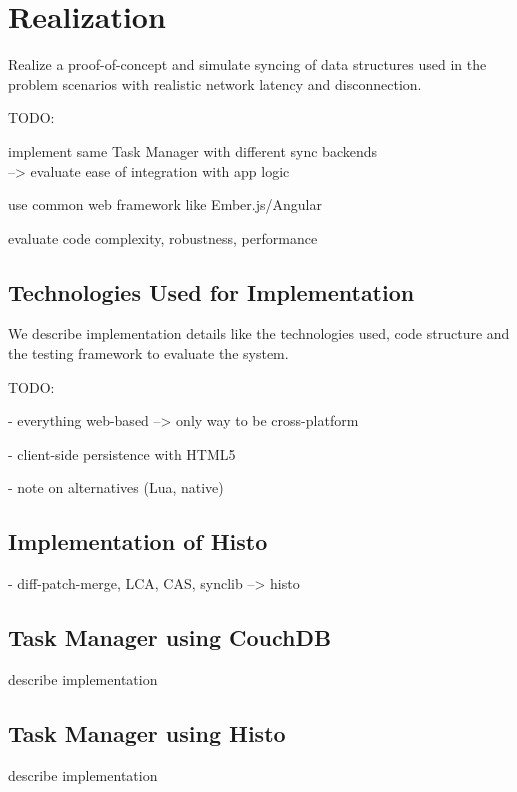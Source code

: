 
\chapter{Realization}
\label{sec:realization}

Realize a proof-of-concept and simulate syncing of data structures
used in the problem scenarios with realistic network latency and
disconnection.

TODO:

implement same Task Manager with different sync backends\\
--> evaluate ease of integration with app logic

use common web framework like Ember.js/Angular

evaluate code complexity, robustness, performance

\section{Technologies Used for Implementation}
We describe implementation details like the technologies used, code structure and the testing framework to evaluate the system.

TODO:

- everything web-based --> only way to be cross-platform

- client-side persistence with HTML5

- note on alternatives (Lua, native)

\section{Implementation of Histo}

- diff-patch-merge, LCA, CAS, synclib --> histo



\section{Task Manager using CouchDB}

describe implementation

\section{Task Manager using Histo}

describe implementation
